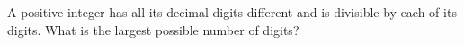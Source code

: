 A positive integer has all its decimal digits different and is divisible by each of its digits. What is the largest possible number of digits?
